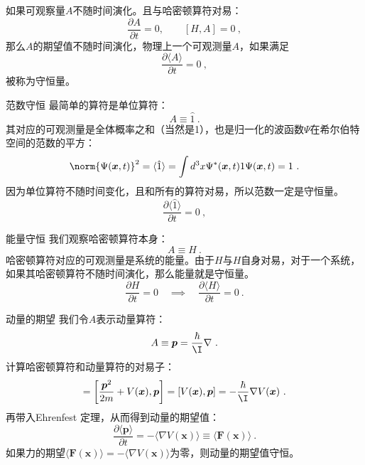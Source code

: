 如果可观察量$A$不随时间演化。且与哈密顿算符对易：
\begin{equation}
\frac{\partial A}{\partial t}=0,\qquad[H, A]=0~,
\end{equation}
那么$A$的期望值不随时间演化，物理上一个可观测量$A$，如果满足
\begin{equation}
\frac{\partial\langle A\rangle}{\partial t}=0~,
\end{equation}
被称为守恒量。
\begin{example}{范数守恒}
最简单的算符是单位算符：
\begin{equation}
A\equiv \hat 1~.
\end{equation}
其对应的可观测量是全体概率之和（当然是1），也是归一化的波函数$\Psi$在希尔伯特空间的范数的平方：
\begin{equation}
\norm{\Psi(\boldsymbol{x}, t)}^2 = \langle\hat{1}\rangle=\int d^{3}x \Psi^{*}(\boldsymbol{x}, t) 1 \Psi(\boldsymbol{x}, t)=1~.
\end{equation}
因为单位算符不随时间变化，且和所有的算符对易，所以范数一定是守恒量。
\begin{equation}
\frac{\partial\langle \hat 1\rangle}{\partial t}=0~,
\end{equation}
\end{example}
\begin{example}{能量守恒}
我们观察哈密顿算符本身：
\begin{equation}
A\equiv H~.
\end{equation}
哈密顿算符对应的可观测量是系统的能量。由于$H$与$H$自身对易，对于一个系统，如果其哈密顿算符不随时间演化，那么能量就是守恒量。
\begin{equation}
\frac{\partial H}{\partial t}=0 \quad\implies\quad \frac{\partial\langle H\rangle}{\partial t}=0~.
\end{equation}
\end{example}
\begin{example}{动量的期望}
我们令$A$表示动量算符：
\begin{equation}
A \equiv \boldsymbol{p} = \frac{\hbar}{\I} \nabla~.
\end{equation}
计算哈密顿算符和动量算符的对易子：
\begin{equation}
[H, \boldsymbol{p}]=\left[\frac{\boldsymbol{p}^2}{2 m}+V(\boldsymbol{x}), \boldsymbol{p}\right]=[V(\boldsymbol{x}), \boldsymbol{p}]=-\frac{\hbar}{\I} \nabla V(\boldsymbol{x})~.
\end{equation}
再带入Ehrenfest 定理，从而得到动量的期望值：
\begin{equation}\label{eq_Ehrenf_1}
\frac{\partial\langle\boldsymbol{p}\rangle}{\partial t}=-\langle\nabla V(\boldsymbol{x})\rangle \equiv\langle\boldsymbol{F}(\boldsymbol{x})\rangle~.
\end{equation}
如果力的期望$\langle\boldsymbol{F}(\boldsymbol{x})\rangle=-\langle\nabla V(\boldsymbol{x})\rangle$为零，则动量的期望值守恒。
\end{example}
